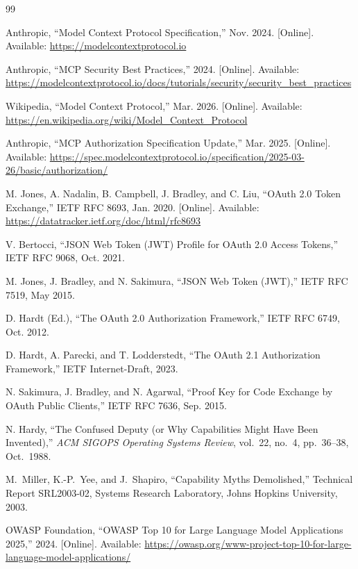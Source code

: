 \documentclass[journal]{IEEEtran}
\begin{document}
\balance

\begin{thebibliography}{99}

Anthropic, ``Model Context Protocol Specification,'' Nov. 2024. [Online]. Available: \url{https://modelcontextprotocol.io}

Anthropic, ``MCP Security Best Practices,'' 2024. [Online]. Available: \url{https://modelcontextprotocol.io/docs/tutorials/security/security_best_practices}

Wikipedia, ``Model Context Protocol,'' Mar. 2026. [Online]. Available: \url{https://en.wikipedia.org/wiki/Model_Context_Protocol}

Anthropic, ``MCP Authorization Specification Update,'' Mar. 2025. [Online]. Available: \url{https://spec.modelcontextprotocol.io/specification/2025-03-26/basic/authorization/}

M. Jones, A. Nadalin, B. Campbell, J. Bradley, and C. Liu, ``OAuth 2.0 Token Exchange,'' IETF RFC 8693, Jan. 2020. [Online]. Available: \url{https://datatracker.ietf.org/doc/html/rfc8693}

V. Bertocci, ``JSON Web Token (JWT) Profile for OAuth 2.0 Access Tokens,'' IETF RFC 9068, Oct. 2021.

M. Jones, J. Bradley, and N. Sakimura, ``JSON Web Token (JWT),'' IETF RFC 7519, May 2015.

D. Hardt (Ed.), ``The OAuth 2.0 Authorization Framework,'' IETF RFC 6749, Oct. 2012.

D. Hardt, A. Parecki, and T. Lodderstedt, ``The OAuth 2.1 Authorization Framework,'' IETF Internet-Draft, 2023.

N. Sakimura, J. Bradley, and N. Agarwal, ``Proof Key for Code Exchange by OAuth Public Clients,'' IETF RFC 7636, Sep. 2015.

N. Hardy, ``The Confused Deputy (or Why Capabilities Might Have Been Invented),'' \textit{ACM SIGOPS Operating Systems Review}, vol.\ 22, no.\ 4, pp.\ 36--38, Oct.\ 1988.

M.\ Miller, K.-P.\ Yee, and J.\ Shapiro, ``Capability Myths Demolished,'' Technical Report SRL2003-02, Systems Research Laboratory, Johns Hopkins University, 2003.

OWASP Foundation, ``OWASP Top 10 for Large Language Model Applications 2025,'' 2024. [Online]. Available: \url{https://owasp.org/www-project-top-10-for-large-language-model-applications/}


\end{thebibliography}
\end{document}
